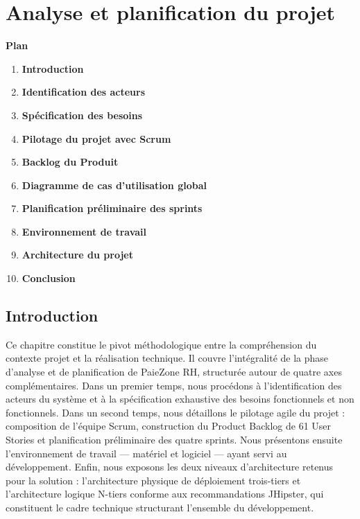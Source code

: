 \newpage
\chapter{Analyse et planification du projet}
\vspace{2cm}

\noindent \textbf{\Large Plan}
\vspace{1cm}
\begin{enumerate}[label=\textbf{\arabic*}, leftmargin=1.5cm, labelsep=0.8cm]
    \item[] \hspace*{-1.5cm}\textbf{Introduction} \dotfill \pageref{sec:intro_ch2}
    \item \textbf{Identification des acteurs} \dotfill \pageref{sec:acteurs}
    \item \textbf{Spécification des besoins} \dotfill \pageref{sec:besoins}
    \item \textbf{Pilotage du projet avec Scrum} \dotfill \pageref{sec:scrum_pilotage}
    \item \textbf{Backlog du Produit} \dotfill \pageref{sec:backlog}
    \item \textbf{Diagramme de cas d'utilisation global} \dotfill \pageref{sec:use_case}
    \item \textbf{Planification préliminaire des sprints} \dotfill \pageref{sec:planif_sprints}
    \item \textbf{Environnement de travail} \dotfill \pageref{sec:env_tech}
    \item \textbf{Architecture du projet} \dotfill \pageref{sec:architectures}
    \item[] \hspace*{-1.5cm}\textbf{Conclusion} \dotfill \pageref{sec:conclusion_ch2}
\end{enumerate}
\vfill
\newpage

\section*{Introduction}\label{sec:intro_ch2}
Ce chapitre constitue le pivot méthodologique entre la compréhension du contexte projet et la réalisation technique. Il couvre l'intégralité de la phase d'analyse et de planification de PaieZone RH, structurée autour de
quatre axes complémentaires.
Dans un premier temps, nous procédons à l'identification des acteurs du système et à la spécification exhaustive
des besoins fonctionnels et non fonctionnels. Dans un second temps, nous détaillons le pilotage agile du projet :
composition de l'équipe Scrum, construction du Product Backlog de 61 User Stories et planification préliminaire des
quatre sprints. Nous présentons ensuite l'environnement de travail — matériel et logiciel — ayant servi au
développement. Enfin, nous exposons les deux niveaux d'architecture retenus pour la solution : l'architecture
physique de déploiement trois-tiers et l'architecture logique N-tiers conforme aux recommandations JHipster, qui
constituent le cadre technique structurant l'ensemble du développement.
